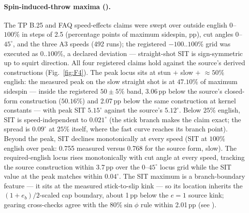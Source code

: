 \paragraph{Spin-induced-throw maxima ().}
The TP B.25 and FAQ speed-effects claims
\citep{alciatore_tp_b25,alciatore_faq} were swept over outside english
$0$--$100\%$ in steps of 2.5 (percentage points of maximum sidespin,
pp), cut angles $0$--$45^\circ$, and the three A3 speeds (492 runs); the
registered $-100..100\%$ grid was executed as $0..100\%$, a declared
deviation --- straight-shot SIT is sign-symmetric up to squirt direction. All four registered claims hold
against the source's derived constructions (Fig.~\ref{fig:F4}). The peak locus sits at stun $+$ slow $+$
$\approx 50\%$ english: the measured peak on the slow straight shot is at
$47.10\%$ of maximum sidespin --- inside the registered $50 \pm 5\%$ band,
3.06\,pp below the source's closed-form construction ($50.16\%$) and
2.07\,pp below the same construction at kernel constants --- with peak SIT
$5.15^\circ$ against the source's $5.12^\circ$. Below $25\%$ english,
SIT is speed-independent to $0.021^\circ$ (the stick branch makes the
claim exact; the spread is $0.09^\circ$ at $25\%$ itself, where the fast
curve reaches its branch point). Beyond the peak, SIT declines
monotonically at every speed (SIT at $100\%$ english over peak: 0.755
measured versus 0.768 for the source form, slow). The required-english
locus rises monotonically with cut angle at every speed, tracking the
source construction within 3.7\,pp over the $0$--$45^\circ$ locus grid
while the SIT value at the peak matches within $0.04^\circ$. The SIT
maximum is a branch-boundary feature --- it sits at the measured
stick-to-slip kink --- so its location inherits the $(1+e_b)/2$-scaled
cap boundary, about 1\,pp below the $e = 1$ source kink; gearing
cross-checks agree with the $80\%\sin\phi$ rule within 2.01\,pp (see
).

